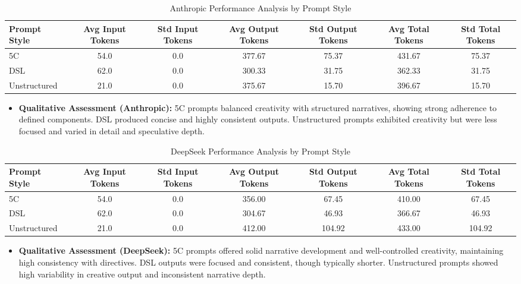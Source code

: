 \documentclass[10pt, a4paper]{article}
\begin{document}
\begin{table}[H]
    \centering
    \caption{Anthropic Performance Analysis by Prompt Style}
    \label{tab:anthropic_performance}
    \begin{tabular}{lcccccc}
        \toprule
        \textbf{Prompt Style} & \textbf{Avg Input Tokens} & \textbf{Std Input Tokens} & \textbf{Avg Output Tokens} & \textbf{Std Output Tokens} & \textbf{Avg Total Tokens} & \textbf{Std Total Tokens} \\
        \midrule
        5C           & 54.0 & 0.0 & 377.67 & 75.37 & 431.67 & 75.37 \\
        DSL          & 62.0 & 0.0 & 300.33 & 31.75 & 362.33 & 31.75 \\
        Unstructured & 21.0 & 0.0 & 375.67 & 15.70 & 396.67 & 15.70 \\
        \bottomrule
    \end{tabular}
    \begin{itemize}
        \item \textbf{Qualitative Assessment (Anthropic):} 5C prompts balanced creativity with structured narratives, showing strong adherence to defined components. DSL produced concise and highly consistent outputs. Unstructured prompts exhibited creativity but were less focused and varied in detail and speculative depth.
    \end{itemize}
\end{table}

\begin{table}[H]
    \centering
    \caption{DeepSeek Performance Analysis by Prompt Style}
    \label{tab:deepseek_performance}
    \begin{tabular}{lcccccc}
        \toprule
        \textbf{Prompt Style} & \textbf{Avg Input Tokens} & \textbf{Std Input Tokens} & \textbf{Avg Output Tokens} & \textbf{Std Output Tokens} & \textbf{Avg Total Tokens} & \textbf{Std Total Tokens} \\
        \midrule
        5C           & 54.0 & 0.0 & 356.00 & 67.45 & 410.00 & 67.45 \\
        DSL          & 62.0 & 0.0 & 304.67 & 46.93 & 366.67 & 46.93 \\
        Unstructured & 21.0 & 0.0 & 412.00 & 104.92 & 433.00 & 104.92 \\
        \bottomrule
    \end{tabular}
    \begin{itemize}
        \item \textbf{Qualitative Assessment (DeepSeek):} 5C prompts offered solid narrative development and well-controlled creativity, maintaining high consistency with directives. DSL outputs were focused and consistent, though typically shorter. Unstructured prompts showed high variability in creative output and inconsistent narrative depth.
    \end{itemize}
\end{table}
\end{document}

